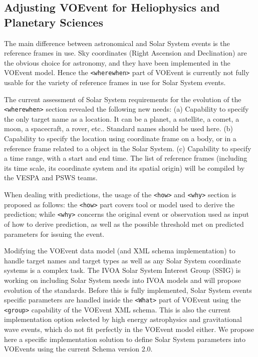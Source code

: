 \documentclass[referee,a4paper,12pt,traditabstract]{swsc}
\begin{document}
\begin{linenumbers}
\section{Adjusting VOEvent for Heliophysics and Planetary Sciences}
The main difference between astronomical and Solar System events is the reference frames in use. Sky coordinates (Right Ascension and Declination) are the obvious choice for astronomy, and they have been implemented in the VOEvent model. Hence the {\tt <wherewhen>} part of VOEvent is currently not fully usable for the variety of reference frames in use for Solar System events. 

The current assessment of Solar System requirements for the evolution of the {\tt <wherewhen>} section revealed the following new needs: (a) Capability to specify the only target name as a location. It can be a planet, a satellite, a comet, a moon, a spacecraft, a rover, etc.. Standard names should be used here. (b) Capability to specify the location using coordinate frame on a body, or in a reference frame related to a object in the Solar System. (c) Capability to specify a time range, with a start and end time. The list of reference frames (including its time scale, its coordinate system and its spatial origin) will be compiled by the VESPA and PSWS teams. 

When dealing with predictions, the usage of the {\tt <how>} and {\tt <why>} section is proposed as follows: the {\tt <how>} part covers tool or model used to derive the prediction; while {\tt <why>} concerns the original event or observation used as input of how to derive prediction, as well as the possible threshold met on predicted parameters for issuing the event.

Modifying the VOEvent data model (and XML schema implementation) to handle target names and target types as well as any Solar System coordinate systems is a complex task. The IVOA Solar System Interest Group (SSIG) is working on including Solar System needs into IVOA models and will propose evolution of the standards. Before this is fully implemented, Solar System events specific parameters are handled inside the {\tt  <What>} part of VOEvent using the {\tt <group>} capability of the VOEvent XML schema. This is also the current implementation option selected by high energy astrophysics and gravitational wave events, which do not fit perfectly in the VOEvent model either. We propose here a specific implementation solution to define Solar System parameters into VOEvents using the current Schema version 2.0.


\end{linenumbers}
\end{document}

